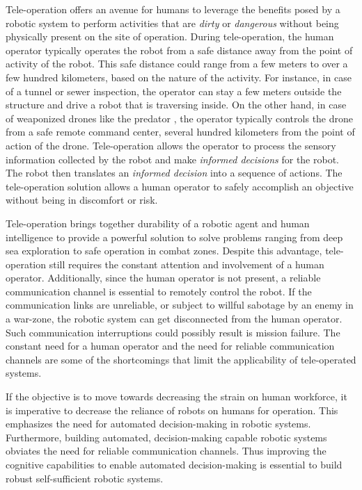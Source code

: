 \documentclass {udthesis}
\begin{document}
Tele-operation offers an avenue for humans to leverage the benefits posed by a robotic system to perform activities 
that are \emph{dirty} or \emph{dangerous} without being physically present on the site of operation. During tele-operation, the human operator 
typically operates the robot from a safe distance away from the point of activity of the robot. This safe distance could range from a few meters to over a few hundred kilometers, based on the nature of the activity. For instance, in case of a tunnel or sewer inspection, the operator can stay a few meters outside the structure and drive a robot that is traversing inside. On the other hand, in case of weaponized drones like the predator \cite{predator}, the operator typically controls the drone from a safe remote command center, several hundred kilometers from the point of action of the drone. Tele-operation allows the operator to process the sensory information collected by the robot and make \emph{informed decisions} for the robot. The robot then translates an \emph{informed decision} into a sequence of actions. The tele-operation solution allows a human operator to safely accomplish an objective 
without being in discomfort or risk. 

Tele-operation brings together durability of a robotic agent and human intelligence to provide a powerful solution to solve problems ranging from deep sea exploration to safe operation in combat zones. Despite this advantage, tele-operation still requires the constant attention and involvement of a human operator. Additionally, since the human operator is not present, a reliable communication channel is essential to remotely control the robot. If the communication links are unreliable, or subject to willful sabotage by an enemy in a war-zone, the robotic system can get disconnected from the human operator. Such communication interruptions could possibly result is mission failure. The constant need for a human operator and the need for reliable communication channels are some of the shortcomings that limit the applicability of tele-operated systems.

If the objective is to move towards decreasing the strain on human workforce, it is imperative to decrease the reliance of robots on humans for operation. This emphasizes the need for automated decision-making in robotic systems. Furthermore, building automated, decision-making capable robotic systems obviates the need for reliable communication channels. Thus improving the cognitive capabilities to enable automated decision-making is essential to build robust self-sufficient robotic systems.
\end{document}
